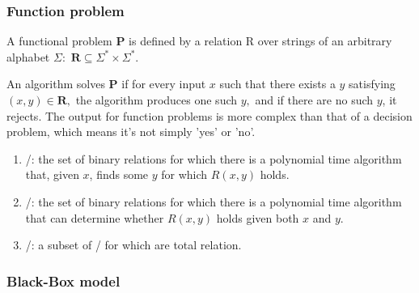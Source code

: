 \documentclass{article}
\begin{document}
\else
\fi

\subsubsection{Function problem}
\begin{Define}
\begin{define}
 A functional problem $\boldsymbol{P}$ is defined by a relation R over strings of an arbitrary alphabet $\Sigma:$ $\boldsymbol{R} \subseteq \Sigma^* \times \Sigma^*.$
\end{define}
\end{Define}

An algorithm solves $\boldsymbol{P}$ if for every input $x$ such that there exists a $y$ satisfying $(x,y) \in \boldsymbol{R},$ the algorithm produces one such $y,$ and if there are no such $y$, it rejects. The output for function problems is more complex than that of a decision problem, which means it's not simply 'yes' or 'no'.

\begin{enumerate}
\item \fp/: the set of binary relations for which there is a polynomial time algorithm that, given $x$, finds some $y$ for which $R(x,y)$ holds.
\item \fnp/: the set of binary relations for which there is a polynomial time algorithm that can determine whether $R(x,y)$ holds given both $x$ and $y.$
\item \tfnp/: a subset of \fnp/ for which are total relation.
\end{enumerate}

\subsubsection{Black-Box model}



\ifx\allfiles\undefined
  
\end{document}

